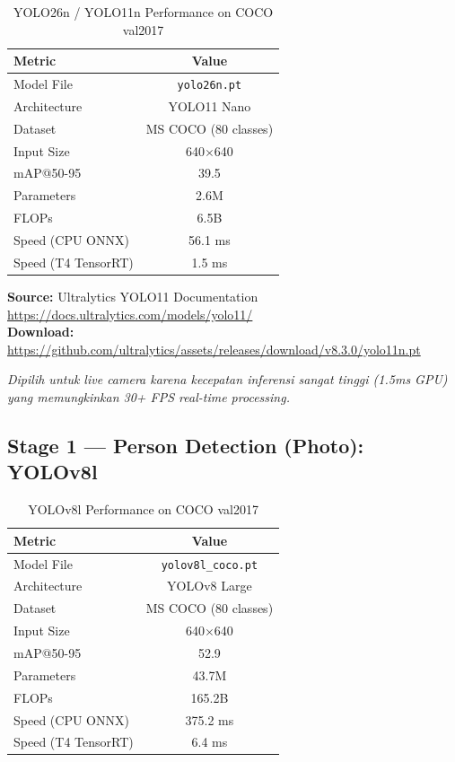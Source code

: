 \documentclass[12pt,a4paper]{article}
\begin{document}
\begin{table}[H]
\centering
\caption{YOLO26n / YOLO11n Performance on COCO val2017}
\begin{tabular}{@{}lc@{}}
\toprule
\textbf{Metric} & \textbf{Value} \\
\midrule
Model File & \texttt{yolo26n.pt} \\
Architecture & YOLO11 Nano \\
Dataset & MS COCO (80 classes) \\
Input Size & 640$\times$640 \\
mAP@50-95 & 39.5 \\
Parameters & 2.6M \\
FLOPs & 6.5B \\
Speed (CPU ONNX) & 56.1 ms \\
Speed (T4 TensorRT) & 1.5 ms \\
\bottomrule
\end{tabular}
\end{table}

\noindent\textbf{Source:} Ultralytics YOLO11 Documentation\\
\url{https://docs.ultralytics.com/models/yolo11/}\\
\textbf{Download:} \url{https://github.com/ultralytics/assets/releases/download/v8.3.0/yolo11n.pt}

\vspace{1em}
\noindent\textit{Dipilih untuk live camera karena kecepatan inferensi sangat tinggi (1.5ms GPU) yang memungkinkan 30+ FPS real-time processing.}

\subsection{Stage 1 — Person Detection (Photo): YOLOv8l}

\begin{table}[H]
\centering
\caption{YOLOv8l Performance on COCO val2017}
\begin{tabular}{@{}lc@{}}
\toprule
\textbf{Metric} & \textbf{Value} \\
\midrule
Model File & \texttt{yolov8l\_coco.pt} \\
Architecture & YOLOv8 Large \\
Dataset & MS COCO (80 classes) \\
Input Size & 640$\times$640 \\
mAP@50-95 & 52.9 \\
Parameters & 43.7M \\
FLOPs & 165.2B \\
Speed (CPU ONNX) & 375.2 ms \\
Speed (T4 TensorRT) & 6.4 ms \\
\bottomrule
\end{tabular}
\end{table}
\end{document}
